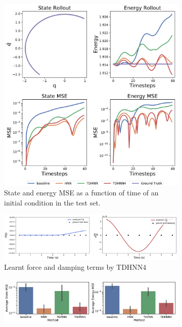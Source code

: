 \documentclass{article}
\begin{document}
\begin{figure}[h!]
\centering
\captionsetup{justification=centering}
	\begin{subfigure}[b]{0.4\textwidth}
		\centering
		\includegraphics[width=\textwidth, trim={0 0 0 12cm},clip]{figures/figures/mass_spring/1/mass_spring_long_0.pdf}
		\caption{State and energy MSE as a function of time of an initial condition in the test set.}
	\end{subfigure}
	\begin{subfigure}[b]{0.48\textwidth}
		\centering
		\includegraphics[width=\textwidth]{figures/figures/mass_spring/1/mass_spring_dpdt_new_0.pdf}
		\caption{Learnt force and damping terms by TDHNN4}
	\end{subfigure}
	\begin{subfigure}[b]{0.48\textwidth}
	    \centering
		\includegraphics[width=\textwidth]{figures/figures/mass_spring/1/mass_spring_errors_0.pdf}

\end{subfigure}
\end{figure}
\end{document}
